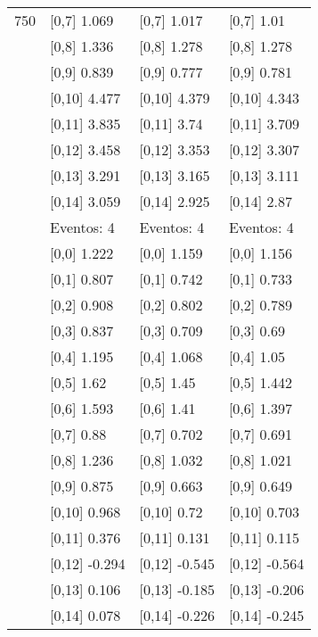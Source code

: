 \begin{table}
\begin{tabular}[t]{llll}
750 & {}[0,7] 1.069 & {}[0,7] 1.017 & {}[0,7] 1.01\\
\addlinespace
 & {}[0,8] 1.336 & {}[0,8] 1.278 & {}[0,8] 1.278\\
 & {}[0,9] 0.839 & {}[0,9] 0.777 & {}[0,9] 0.781\\
 & {}[0,10] 4.477 & {}[0,10] 4.379 & {}[0,10] 4.343\\
 & {}[0,11] 3.835 & {}[0,11] 3.74 & {}[0,11] 3.709\\
 & {}[0,12] 3.458 & {}[0,12] 3.353 & {}[0,12] 3.307\\
\addlinespace
 & {}[0,13] 3.291 & {}[0,13] 3.165 & {}[0,13] 3.111\\
 & {}[0,14] 3.059 & {}[0,14] 2.925 & {}[0,14] 2.87\\
 & Eventos:  4 & Eventos:  4 & Eventos:  4\\
 & {}[0,0] 1.222 & {}[0,0] 1.159 & {}[0,0] 1.156\\
 & {}[0,1] 0.807 & {}[0,1] 0.742 & {}[0,1] 0.733\\
\addlinespace
 & {}[0,2] 0.908 & {}[0,2] 0.802 & {}[0,2] 0.789\\
 & {}[0,3] 0.837 & {}[0,3] 0.709 & {}[0,3] 0.69\\
 & {}[0,4] 1.195 & {}[0,4] 1.068 & {}[0,4] 1.05\\
 & {}[0,5] 1.62 & {}[0,5] 1.45 & {}[0,5] 1.442\\
 & {}[0,6] 1.593 & {}[0,6] 1.41 & {}[0,6] 1.397\\
\addlinespace
1000 & {}[0,7] 0.88 & {}[0,7] 0.702 & {}[0,7] 0.691\\
 & {}[0,8] 1.236 & {}[0,8] 1.032 & {}[0,8] 1.021\\
 & {}[0,9] 0.875 & {}[0,9] 0.663 & {}[0,9] 0.649\\
 & {}[0,10] 0.968 & {}[0,10] 0.72 & {}[0,10] 0.703\\
 & {}[0,11] 0.376 & {}[0,11] 0.131 & {}[0,11] 0.115\\
\addlinespace
 & {}[0,12] -0.294 & {}[0,12] -0.545 & {}[0,12] -0.564\\
 & {}[0,13] 0.106 & {}[0,13] -0.185 & {}[0,13] -0.206\\
 & {}[0,14] 0.078 & {}[0,14] -0.226 & {}[0,14] -0.245\\
\bottomrule
\end{tabular}
\end{table}
